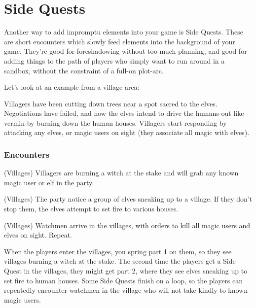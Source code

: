 \section{Side Quests}\label{sidequests}

\begin{multicols}{2}

\noindent
Another way to add impromptu elements into your game is Side Quests.
These are short encounters which slowly feed elements into the background of your game.
They're good for foreshadowing without too much planning, and good for adding things to the path of players who simply want to run around in a sandbox, without the constraint of a full-on plot-arc.

Let's look at an example from a village area:

\begin{exampletext}

  Villagers have been cutting down trees near a spot sacred to the elves.
  Negotiations have failed, and now the elves intend to drive the humans out like vermin by burning down the human houses.
  Villagers start responding by attacking any elves, or magic users on sight (they associate all magic with elves).

\end{exampletext}

\subsubsection{Encounters}

\begin{list}{\Square}{}

\item[\CheckedBox]{(Villages) Villagers are burning a witch at the stake and will grab any known magic user or elf in the party.}

\item{(Villages) The party notice a group of elves sneaking up to a village. If they don't stop them, the elves attempt to set fire to various houses.}

\item{(Villages) Watchmen arrive in the villages, with orders to kill all magic users and elves on sight. Repeat.}

\end{list}

When the players enter the villages, you spring part 1 on them, so they see villages burning a witch at the stake.
The second time the players get a Side Quest in the villages, they might get part 2, where they see elves sneaking up to set fire to human houses.
Some Side Quests finish on a loop, so the players can repeatedly encounter watchmen in the village who will not take kindly to known magic users.


\end{multicols}
